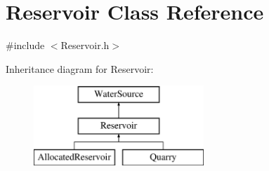 \hypertarget{classReservoir}{}\section{Reservoir Class Reference}
\label{classReservoir}


{\ttfamily \#include $<$Reservoir.\+h$>$}

Inheritance diagram for Reservoir\+:\begin{figure}[H]
\begin{center}
\leavevmode
\includegraphics[height=3.000000cm]{classReservoir}
\end{center}
\end{figure}
